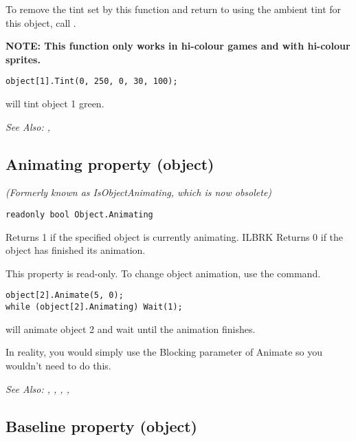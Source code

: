 To remove the tint set by this function and return to using the ambient tint for this
object, call .

\bf{NOTE:} This function only works in hi-colour games and with hi-colour sprites.

\begin{verbatim}
object[1].Tint(0, 250, 0, 30, 100);
\end{verbatim}
will tint object 1 green.

\it{See Also:} ,



\subsection{Animating property (object)}\label{Object.Animating}%

\it{(Formerly known as IsObjectAnimating, which is now obsolete)}

\begin{verbatim}
readonly bool Object.Animating
\end{verbatim}
Returns 1 if the specified object is currently animating. ILBRK
Returns 0 if the object has finished its animation.

This property is read-only. To change object animation, use the
 command.

\begin{verbatim}
object[2].Animate(5, 0);
while (object[2].Animating) Wait(1);
\end{verbatim}
will animate object 2 and wait until the animation finishes.

In reality, you would simply use the Blocking parameter of Animate so you wouldn't need
to do this.

\it{See Also:} ,
,
,
, 


\subsection{Baseline property (object)}\label{Object.Baseline}%

